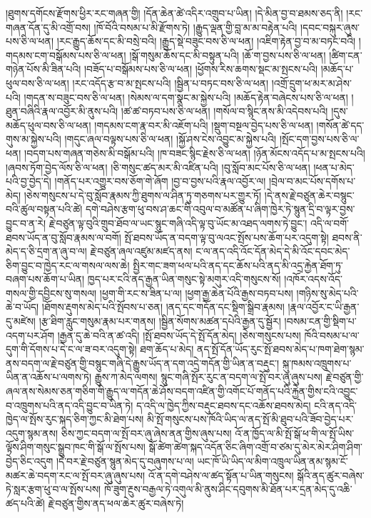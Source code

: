 \documentclass{article}
\begin{document}
།ཐུགས་དགོངས་རྫོགས་ཕྱིར་རང་གཞན་གྱི། །དོན་ཆེན་ཚེ་འདིར་འགྲུབ་པ་ཡིན། །དེ་མིན་བྱ་བ་ཐམས་ཅད་ནི། །རང་གཞན་དོན་དུ་མི་འགྲོ་བས། །ཁོ་བོའི་བསམ་པ་མི་རྫོགས་ཏེ། །རྒྱུད་ལྡན་གྱི་བླ་མ་མ་བརྟེན་པའི། །དབང་བསྐུར་ཞུས་པས་ཅི་ལ་ཕན། །རང་རྒྱུད་ཆོས་དང་མི་བསྲེ་བའི། །རྒྱུད་སྡེ་བཟུང་བས་ཅི་ལ་ཕན། །འཇིག་རྟེན་བྱ་བ་མ་བཏང་བའི། །གདམས་ངག་བསྒོམས་པས་ཅི་ལ་ཕན། །སྒོ་གསུམ་ཆོས་དང་མི་བསྟུན་པའི། །ཆོ་ག་བྱས་པས་ཅི་ལ་ཕན། །ཚིག་ངན་གཉེན་པོས་མི་ཟིན་པའི། །བཟོད་པ་བསྒོམས་པས་ཅི་ལ་ཕན། །ཕྱོགས་རིས་ཆགས་སྡང་མ་སྤངས་པའི། །མཆོད་པ་ཕུལ་བས་ཅི་ལ་ཕན། །རང་འདོད་རྩ་བ་མ་སྤངས་པའི། །སྦྱིན་པ་བཏང་བས་ཅི་ལ་ཕན། །འགྲོ་དྲུག་ཕ་མར་མ་ཤེས་པའི། །གདན་ས་བཟུང་བས་ཅི་ལ་ཕན། །སེམས་ལ་དག་སྣང་མ་སྐྱེས་པའི། །མཆོད་རྟེན་བཞེངས་པས་ཅི་ལ་ཕན། །ཐུན་བཞིའི་རྣལ་འབྱོར་མི་ནུས་པའི། །ཚ་ཚ་བཏབ་པས་ཅི་ལ་ཕན། །གསོལ་བ་སྙིང་ནས་མི་འདེབས་པའི། །དུས་མཆོད་ཕུལ་བས་ཅི་ལ་ཕན། །གདམས་ངག་རྣ་བར་མི་འཇོག་པའི། །སྡུག་བསྔལ་བྱེད་པས་ཅི་ལ་ཕན། །གསོན་ཚེ་དད་གུས་མ་སྐྱེས་པའི། །གདུང་ཞལ་བལྟས་པས་ཅི་ལ་ཕན། །སྐྱོ་ཤས་ངེས་འབྱུང་མ་སྐྱེས་པའི། །སྤོང་དག་བྱས་པས་ཅི་ལ་ཕན། །བདག་པས་གཞན་གཅེས་མི་བསྒོམ་པའི། །ཁ་བཟང་སྙིང་རྗེས་ཅི་ལ་ཕན། །ཉོན་མོངས་འདོད་པ་མ་སྤངས་པའི། །ཞབས་ཏོག་བྱེད་ལོས་ཅི་ལ་ཕན། །ཅི་གསུང་ཚད་མར་མི་འཛིན་པའི། །བུ་སློབ་མང་པོས་ཅི་ལ་ཕན། །ཕན་པ་མེད་པའི་བྱ་བྱེད་དེ། །གནོད་པར་འགྱུར་བས་ཅོག་གེ་ཞོག །བྱ་བ་བྱས་པའི་རྣལ་འབྱོར་ལ། །བྲེལ་བ་མང་པོས་དགོས་པ་མེད། །ཅེས་གསུངས་པ་དེ་བུ་སློབ་རྣམས་ཀྱི་ཐུགས་ལ་ཤིན་ཏུ་གཅགས་པར་གྱུར་ཏོ། །དེ་ནས་རྗེ་བཙུན་ཆེར་བསྙུང་བའི་ཚུལ་བསྟན་པའི་ཚེ། དགེ་བཤེས་རྩག་ཕུ་བས་ཤ་ཆང་གི་འབུལ་བ་མཚོན་པ་ཞིག་ཁྱེར་ཏེ་སྙུན་དྲི་བ་ལྟར་བྱས་བྱུང་བ་ན་རེ། རྗེ་བཙུན་ལྟ་བུའི་གྲུབ་ཐོབ་ལ་ཡང་སྙུང་གཞི་འདི་ལྟ་བུ་ཡོང་མ་འཐད་ལགས་ཏེ་བྱུང་། འདི་ལ་བགོ་ཐབས་ཡོད་ན་བུ་སློབ་རྣམས་ལ་བགོ། སྤོ་ཐབས་ཡོད་ན་བདག་ལྟ་བུ་ལའང་སྤོས་པས་ཆོག་པར་འདུག་སྟེ། ཐབས་ནི་མེད་ད་ཅི་དྲག་ན་ཞུ་བ་ལ། རྗེ་བཙུན་ཞལ་འཛུམ་མཛད་ནས། ང་ལ་ནད་འདི་འོང་དོན་མེད་དེ་མི་འོང་དབང་མེད་ཅིག་བྱུང་བ་ཁྱེད་རང་ལ་གསལ་ལས་ཆེ། སྤྱིར་གང་ཟག་ཕལ་པའི་ནད་དང་ཆོས་པའི་ནད་མི་འདྲ་རྐྱེན་ཐོག་ཏུ་བཞག་པས་ཆོག་པ་ཡིན། ཁྱད་པར་ངའི་ནད་རྒྱན་ཡིན་གསུང་སྟེ་མགུར་འདི་གསུངས་སོ། །འཁོར་འདས་འོད་གསལ་གྱི་དབྱིངས་སུ་གསལ། །ཕྱག་གི་རང་ས་ཟིན་པ་ལ། །ཕྱག་རྒྱ་ཆེན་པོའི་རྒྱས་བཏབ་པས། །གཉིས་སུ་མེད་པའི་ཆེ་བ་ཡོད། །ཐོགས་རྡུགས་མེད་པའི་སྤོབས་པ་ཅན། །ནད་དང་གདོན་དང་སྡིག་སྒྲིབ་རྣམས། །རྣལ་འབྱོར་ང་ཡི་རྒྱན་དུ་མཛེས། །རྩ་ཐིག་རླུང་གསུམ་རྣམ་པར་གནས། །སྦྱིན་སོགས་མཚན་དཔེའི་རྒྱན་དུ་སྦྱོར། །བསམ་ངན་གྱི་སྡིག་པ་འདག་པར་ཤོག །རྒྱན་དུ་ཆེ་བའི་ན་ཚ་འདི། །སྤོ་ཐབས་ཡོད་དེ་སྤོ་དོན་མེད། །ཅེས་གསུངས་པས། ཁོའི་བསམ་པ་ལ་དུག་གི་དོགས་པ་དེ་ང་ལ་ཟ་བར་འདུག་སྟེ། ཐག་ཆོད་པ་མེད། ནད་སྤོ་དོན་ཡོད་རུང་སྤོ་ཐབས་མེད་པ་ཁག་ཐེག་སྙམ་ནས་བདག་ལ་རྗེ་བཙུན་གྱི་བསྙུང་གཞི་དེ་རྒྱུས་ཡོད་ན་དག་འདྲེ་གདོན་གྱི་ཡིན་ན་བརྡུང་། སྐུ་ཁམས་འཁྲུགས་པ་ཡིན་ན་འཆོས་པ་ལགས་ཏེ། རྒྱུས་ཀ་མེད་ལགས། སྙུང་གཞི་སྤོར་རུང་ན་བདག་ལ་སྤོ་བར་ཞུ་ཞུས་པས། རྗེ་བཙུན་གྱི་ཞལ་ནས་སེམས་ཅན་གཅིག་གི་རྒྱུད་ལ་གདོན་ཆེ་ཤོས་བདག་འཛིན་གྱི་འགོང་པོ་གནོད་པའི་རྐྱེན་གྱིས་ངའི་འབྱུང་བ་འཁྲུགས་པའི་ནད་འདི་བྱུང་བ་ཡིན་ཏེ། ད་འདི་ལ་ཁྱེད་ཀྱིས་བརྡུང་ཐབས་དང་འཆོས་ཐབས་མེད། ངའི་ནད་འདི་ཁྱེད་ལ་སྤོས་རུང་སྐད་ཅིག་ཀྱང་མི་ཐེག་པས། མི་སྤོ་གསུངས་པས་ཁོའི་ཡིད་ལ་ནད་སྤོ་མི་ཐུབ་པའི་ཟོབ་བྱེད་པར་འདུག་སྙམ་ནས། ཅིས་ཀྱང་བདག་ལ་སྤོ་བར་ཞུ་ཞེས་ནན་གྱིས་ཞུས་པས། འོ་ན་ཁྱོད་ལ་མི་སྤོ་སྒོ་ཕ་གི་ལ་སྤོ་ཡིས་ལྟོས་ཤིག་གསུང་སྒྲུབ་ཁང་གི་སྒོ་ལ་སྤོས་པས། སྒོ་ཚེག་ཚེག་སྐད་འདོན་ཅིང་ཞིག་འགྲོ་བ་ཙམ་དུ་མེར་མེར་ཤིག་ཤིག་བྱེད་ཅིང་འདུག །དེ་བར་རྗེ་བཙུན་སྙུན་མེད་དུ་བཞུགས་པ་ལ། ཡང་ཁོ་ཡི་ཡིད་ལ་མིག་འཁྲུལ་ཡིན་ནམ་སྙམ་ངོ་མཚར་ཆེ་བདག་རང་ལ་སྤོ་བར་ཞུ་ཞུས་པས། འོ་ན་དགེ་བཤེས་ལ་ཚད་སྟོན་པ་ཡིན་གསུངས། སྒོའི་ནད་ཚུར་བཞེས་ཏེ་སླར་རྩག་ཕུ་བ་ལ་སྤོས་པས། ཁོ་ཟུག་རྔུས་བརྒྱལ་ཏེ་འགུལ་མི་ནུས་ཤིང་དབུགས་མི་ཐོན་པར་དྲན་མེད་དུ་འཆི་ཚད་པའི་ཚེ། རྗེ་བཙུན་གྱིས་ནད་ཕལ་ཆེར་ཚུར་བཞེས་ཏེ། 
\end{document}
